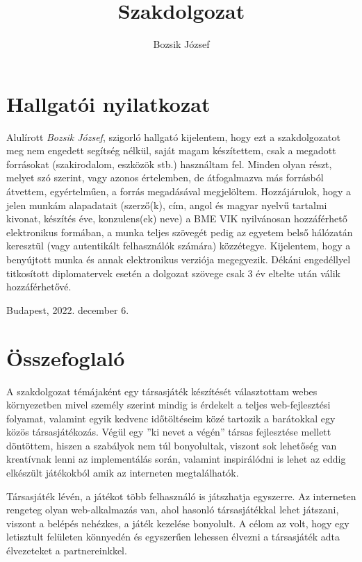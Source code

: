 \documentclass[a4paper,twoside]{article}
\title{Szakdolgozat}
\author{Bozsik József}
\begin{document}
\maketitle
\newpage
\tableofcontents
\newpage
{\centering
\section*{Hallgatói nyilatkozat}}
Alulírott \textit{Bozsik József}, szigorló hallgató kijelentem, hogy ezt a szakdolgozatot meg
nem engedett segítség nélkül, saját magam készítettem, csak a megadott forrásokat (szakirodalom, eszközök stb.) használtam fel. Minden olyan részt, melyet szó szerint, vagy
azonos értelemben, de átfogalmazva más forrásból átvettem, egyértelműen, a forrás megadásával megjelöltem.
Hozzájárulok, hogy a jelen munkám alapadatait (szerző(k), cím, angol és magyar
nyelvű tartalmi kivonat, készítés éve, konzulens(ek) neve) a BME VIK nyilvánosan hozzáférhető elektronikus formában, a munka teljes szövegét pedig az egyetem belső hálózatán
keresztül (vagy autentikált felhasználók számára) közzétegye. Kijelentem, hogy a benyújtott munka és annak elektronikus verziója megegyezik. Dékáni engedéllyel titkosított diplomatervek esetén a dolgozat szövege csak 3 év eltelte után válik hozzáférhetővé.
\begin{flushleft}
	Budapest, 2022. december 6.
\end{flushleft}

\newpage
\section{Összefoglaló}
A szakdolgozat témájaként egy társasjáték készítését választottam webes környezetben mivel személy szerint mindig is érdekelt a teljes web-fejlesztési folyamat, valamint egyik kedvenc időtöltéseim közé tartozik a barátokkal egy közös társasjátékozás. 
Végül egy ''ki nevet a végén'' társas fejlesztése mellett döntöttem, hiszen a szabályok nem túl bonyolultak, viszont sok lehetőség van kreatívnak lenni az implementálás során, valamint inspirálódni is lehet az eddig elkészült játékokból amik az interneten megtalálhatók.

Társasjáték lévén, a játékot több felhasználó is játszhatja egyszerre.  Az interneten rengeteg olyan web-alkalmazás van, ahol hasonló társasjátékkal
lehet játszani, viszont a belépés nehézkes, a játék kezelése bonyolult. A célom az volt, hogy
egy letisztult felületen könnyedén és egyszerűen lehessen élvezni a társasjáték adta
élvezeteket a partnereinkkel.
\end{document}
